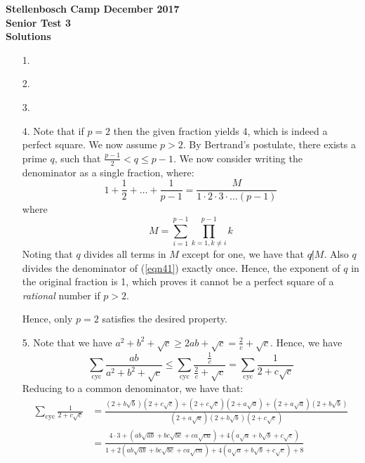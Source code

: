 \documentclass[a4paper, 12pt]{article}
\begin{document}
\begin{center}
\textbf{Stellenbosch Camp December 2017 \\ Senior Test 3} \\
\textbf{Solutions}
\end{center}

\begin{enumerate}

    \item[1.] 
    
    \item[2.] 
    
    \item[3.] 
    
    
    \item[4.] Note that if $p=2$ then the given fraction yields 4, which is indeed a perfect square. We now assume $p > 2$. By Bertrand's postulate, there exists a prime $q$, such that $\frac{p-1}{2} < q \leq p-1$. We now consider writing the denominator as a single fraction, where:
    \begin{equation} \label{eqn41}
        1+\frac{1}{2}+\dots+\frac{1}{p-1} = \frac{M}{1 \cdot 2 \cdot 3 \cdot \dots (p-1)}
    \end{equation}
    where
    $$ M = \sum_{i=1}^{p-1}  \prod_{k=1, k \neq i}^{p-1} k $$
    Noting that $q$ divides all terms in $M$ except for one, we have that $q \not | M$. Also $q$ divides the denominator of (\ref{eqn41}) exactly once. Hence, the exponent of $q$ in the original fraction is 1, which proves it cannot be a perfect square of a \textit{rational} number if $p>2$.
    
    Hence, only $p=2$ satisfies the desired property.
    
    \item[5.]  %
    Note that we have $a^2 + b^2 + \sqrt{c} \geq 2ab + \sqrt{c} = \frac{2}{c} + \sqrt{c}$. Hence, we have
    $$ \sum_\textrm{cyc} \frac {ab}{a^2 + b^2 + \sqrt {c}} \leq \sum_\textrm{cyc} \frac{\frac{1}{c}}{\frac{2}{c} + \sqrt{c}} = \sum_\textrm{cyc} \frac{1}{2 + c\sqrt{c}} $$
    Reducing to a common denominator, we have that:
    \begin{align}
        \sum_\textrm{cyc} \frac{1}{2 + c\sqrt{c}} &= \frac{(2 + b \sqrt{b})(2 + c \sqrt{c}) + (2 + c \sqrt{c})(2 + a \sqrt{a}) + (2 + a \sqrt{a})(2 + b \sqrt{b})}{(2 + a \sqrt{a})(2 + b \sqrt{b})(2 + c \sqrt{c})} \nonumber \\
        &= \frac{4 \cdot 3 + (ab\sqrt{ab} + bc\sqrt{bc} + ca\sqrt{ca}) + 4(a\sqrt{a} + b\sqrt{b} + c\sqrt{c})}{1 + 2(ab\sqrt{ab} + bc\sqrt{bc} + ca\sqrt{ca}) + 4(a\sqrt{a} + b\sqrt{b} + c\sqrt{c}) + 8} \label{eqn51}
    \end{align} 
    

\end{enumerate}
\end{document}
